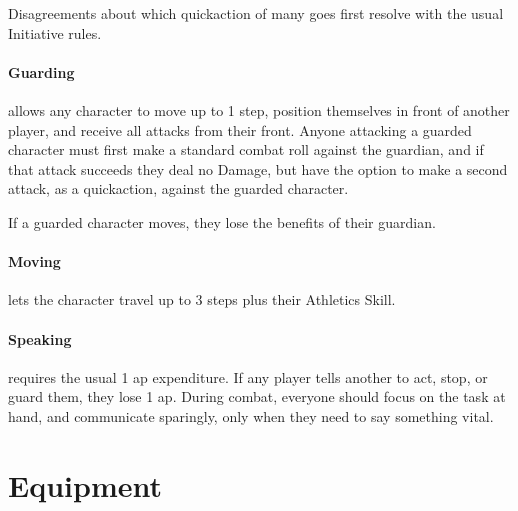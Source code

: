 \begin{multicols}{2}
Disagreements about which \gls{quickaction} of many goes first resolve with the usual Initiative rules.

\paragraph{Guarding}
allows any character to move up to 1 \gls{step}, position themselves in front of another player, and receive all attacks from their front.
Anyone attacking a guarded character must first make a standard combat roll against the guardian, and if that attack succeeds they deal no Damage, but have the option to make a second attack, as a \gls{quickaction}, against the guarded character.

If a guarded character moves, they lose the benefits of their guardian.

\paragraph{Moving}
lets the character travel up to 3 steps plus their Athletics Skill.

\paragraph{Speaking}
requires the usual 1 \gls{ap} expenditure.
If any player tells another to act, stop, or guard them, they lose 1 \gls{ap}.
During combat, everyone should focus on the task at hand, and communicate sparingly, only when they need to say something vital.

\end{multicols}

\section{Equipment}

